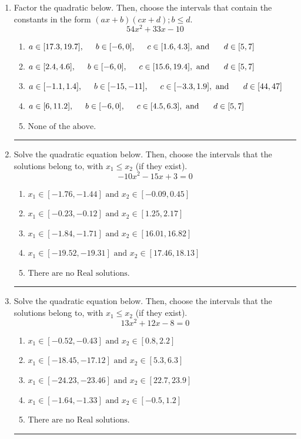 \documentclass[14pt]{extbook}
\newcommand{\litem}[1]{\item#1\hspace*{-1cm}\rule{\textwidth}{0.4pt}}
\begin{document}
\begin{enumerate}
{\begin{enumerate}[label=\Alph*.]
\end{enumerate} }
\litem{
Factor the quadratic below. Then, choose the intervals that contain the constants in the form $(ax+b)(cx+d); b \leq d.$\[ 54x^{2} +33 x -10 \]\begin{enumerate}[label=\Alph*.]
\item \( a \in [17.3, 19.7], \hspace*{5mm} b \in [-6, 0], \hspace*{5mm} c \in [1.6, 4.3], \text{ and } \hspace*{5mm} d \in [5, 7] \)
\item \( a \in [2.4, 4.6], \hspace*{5mm} b \in [-6, 0], \hspace*{5mm} c \in [15.6, 19.4], \text{ and } \hspace*{5mm} d \in [5, 7] \)
\item \( a \in [-1.1, 1.4], \hspace*{5mm} b \in [-15, -11], \hspace*{5mm} c \in [-3.3, 1.9], \text{ and } \hspace*{5mm} d \in [44, 47] \)
\item \( a \in [6, 11.2], \hspace*{5mm} b \in [-6, 0], \hspace*{5mm} c \in [4.5, 6.3], \text{ and } \hspace*{5mm} d \in [5, 7] \)
\item \( \text{None of the above.} \)

\end{enumerate} }
\litem{
Solve the quadratic equation below. Then, choose the intervals that the solutions belong to, with $x_1 \leq x_2$ (if they exist).\[ -10x^{2} -15 x + 3 = 0 \]\begin{enumerate}[label=\Alph*.]
\item \( x_1 \in [-1.76, -1.44] \text{ and } x_2 \in [-0.09, 0.45] \)
\item \( x_1 \in [-0.23, -0.12] \text{ and } x_2 \in [1.25, 2.17] \)
\item \( x_1 \in [-1.84, -1.71] \text{ and } x_2 \in [16.01, 16.82] \)
\item \( x_1 \in [-19.52, -19.31] \text{ and } x_2 \in [17.46, 18.13] \)
\item \( \text{There are no Real solutions.} \)

\end{enumerate} }
\litem{
Solve the quadratic equation below. Then, choose the intervals that the solutions belong to, with $x_1 \leq x_2$ (if they exist).\[ 13x^{2} +12 x -8 = 0 \]\begin{enumerate}[label=\Alph*.]
\item \( x_1 \in [-0.52, -0.43] \text{ and } x_2 \in [0.8, 2.2] \)
\item \( x_1 \in [-18.45, -17.12] \text{ and } x_2 \in [5.3, 6.3] \)
\item \( x_1 \in [-24.23, -23.46] \text{ and } x_2 \in [22.7, 23.9] \)
\item \( x_1 \in [-1.64, -1.33] \text{ and } x_2 \in [-0.5, 1.2] \)
\item \( \text{There are no Real solutions.} \)


\end{enumerate}}
\end{enumerate}
\end{document}

